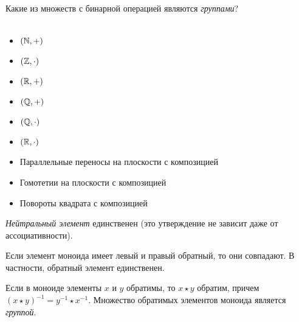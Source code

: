 \documentclass{article}
\begin{document}
    \begin{task_boxed}
        Какие из множеств с бинарной операцией являются \textit{группами}?\\
        \\
        \begin{minipage}[c]{0.15\textwidth}
            \begin{itemize}
                \item $(\mathbb{N}, +)$
                \item $(\mathbb{Z}, \cdot)$
                \item $(\mathbb{R}, +)$
            \end{itemize}
        \end{minipage}
        \begin{minipage}[c]{0.15\textwidth}
            \begin{itemize}
                \item $(\mathbb{Q}, +)$
                \item $(\mathbb{Q}, \cdot)$
                \item $(\mathbb{R}, \cdot)$
            \end{itemize}
        \end{minipage}
        \begin{minipage}[c]{0.7\textwidth}
            \begin{itemize}
                \item Параллельные переносы на плоскости с композицией
                \item Гомотетии на плоскости с композицией
                \item Повороты квадрата с композицией
            \end{itemize}
        \end{minipage}
    \end{task_boxed}

    \begin{task_boxed}
        \textit{Нейтральный элемент} единственен (это утверждение не зависит даже от ассоциативности).
    \end{task_boxed}

    \begin{task_boxed}
        Если элемент моноида имеет левый и правый обратный, то они совпадают.
        В частности, обратный элемент единственен.
    \end{task_boxed}

    \begin{task_boxed}
        \label{mul-sub-gr}
        Если в моноиде элементы $x$ и $y$ обратимы, то $x \star y$ обратим, причем $(x \star y)^{-1} = y^{-1} \star x^{-1}$.
        Множество обратимых элементов моноида является \textit{группой}.
    \end{task_boxed}
\end{document}
